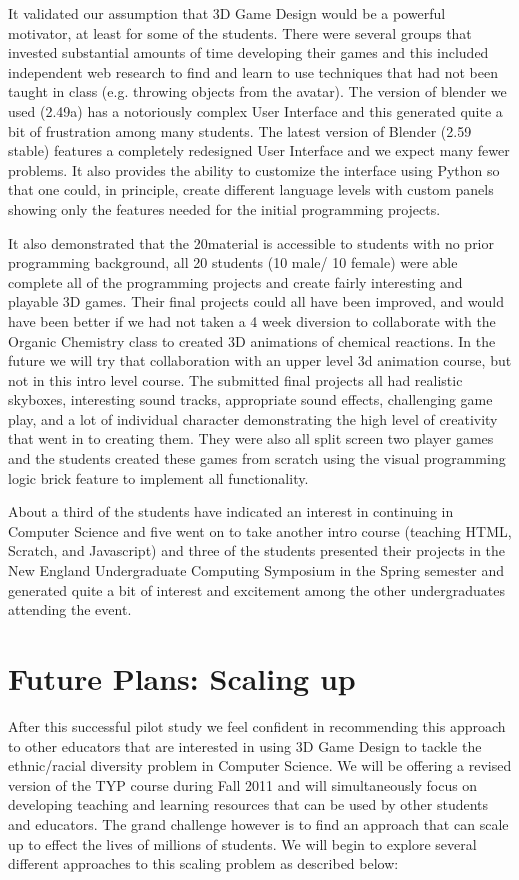 \documentclass{sig-alternate}
\begin{document}
It validated our
assumption that 3D Game Design would be a powerful motivator, at least for some of the students.
There were several groups that invested substantial amounts of time developing their games and this included independent web research to find and learn to use techniques that had not been taught in
class (e.g. throwing objects from the avatar).  The version of blender we used (2.49a) has a notoriously
complex User Interface and this generated quite a bit of frustration among many students. The latest
version of Blender (2.59 stable) features a completely redesigned User Interface and we expect many
fewer problems. It also provides the ability to customize the interface using Python so that one could,
in principle, create different language levels with custom panels showing only the features needed for the 
initial programming projects.

It also demonstrated that the 20material is accessible to students with no prior programming background, all 20 students (10 male/ 10 female) were able complete all of the programming projects
and create fairly interesting and playable 3D games.  Their final projects could all have been improved,
and would have been better if we had not taken a 4 week diversion to collaborate with the Organic Chemistry class to created 3D animations of chemical reactions.  In the future we will try that collaboration with an upper level 3d animation course, but not in this intro level course. The submitted final projects all had realistic skyboxes, interesting sound tracks, appropriate sound effects, challenging game play, and a lot of individual character demonstrating the high level of creativity that went in to creating them. They were also all split screen two player games and the students created these games from scratch using the visual programming logic brick feature to implement all functionality. 

About a third of the students have indicated an interest in continuing in Computer Science and five went on to take another intro course (teaching HTML, Scratch, and Javascript) and three of the students presented their projects in the New England Undergraduate Computing Symposium in the Spring semester and generated quite a bit of interest and excitement among the other undergraduates attending the event.
 

\section{Future Plans: Scaling up}
After this successful pilot study we feel confident in recommending this approach to other educators that are interested in using 3D Game Design to tackle the ethnic/racial diversity problem in Computer Science. We will be offering a revised version of the TYP course during Fall 2011 and will simultaneously focus on developing teaching and learning resources that can be used by other students and educators. The grand challenge however is to find an approach that can scale up to effect the lives of millions of students.  We will begin to explore several different approaches to this scaling problem as described below:
\end{document}
